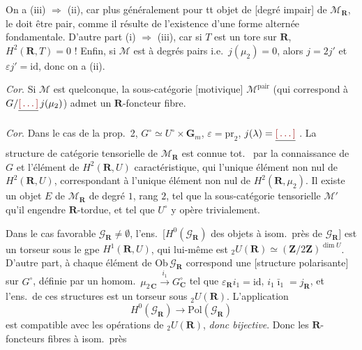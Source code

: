 \documentclass[11pt,a4paper]{article}
\begin{document}
On a (iii) $\Rightarrow$ (ii), car plus généralement pour tt
\struck{\ill{}} objet de [degré impair]  de
$\mathcal{M}_{\mathbf{R}}$, le   doit être
pair, comme il résulte de l'existence d'une forme alternée fondamentale.
D'autre part (i) $\Rightarrow$ (iii), car si $T$ est un tore
 sur $\mathbf{R}$, 
$H^{2}(\mathbf{R}, T) = 0$ ! Enfin, si  $\mathcal{M}$ est à
degrés pairs i.e.\ $j(\mu_{2}) = 0$, alors $j = 2j'$ et
$\varepsilon j' = \mathrm{id}$, donc on a (ii).

\emph{Cor}. Si $\mathcal{M}$ est quelconque, la sous-catégorie [motivique]
$\mathcal{M}^{\mathrm{pair}}$ \struck{\ill{}} (qui correspond à
$G/\struck{\ill{}}\,j(\mu_{2})$) \struck{\ill{}} admet un
$\mathbf{R}$-foncteur fibre.

\emph{Cor}. Dans le cas de la prop.\ 2,  
$G^{\circ} \simeq U^{\circ} \times \mathbf{G}_{m}$, $\varepsilon = \mathrm{pr}_{2}$,
$j(\lambda) = \struck{\ill{}}$ . La structure
 de catégorie tensorielle de
$\mathcal{M}_{\mathbf{R}}$ est connue tot.\ \ill{} par la connaissance de
$G$ et l'élément de $H^{2}(\mathbf{R}, U)$ caractéristique, qui
\struck{\ill{}} \ill{} l'unique élément non nul de $H^{2}(\mathbf{R}, U)$,
correspondant à l'unique élément non nul de $H^{2}(\mathbf{R}, \mu_{2})$.
Il existe un \struck{\ill{}} objet $E$ de $\mathcal{M}_{\mathbf{R}}$
\struck{\ill{}} de degré $1$, rang $2$, \struck{\ill{}} tel que la
sous-catégorie tensorielle \struck{\ill{}} $\mathcal{M}'$ qu'il engendre
\ill{} \ill{} $\mathbf{R}$-tordue, et \struck{\ill{} \ill{}} tel que
$U^{\circ}$ y opère trivialement.

Dans le cas favorable $\mathcal{G}_{\mathbf{R}} \neq \emptyset$,
 l'ens.\ [$H^{0}(\mathcal{G}_{\mathbf{R}})$
des objets à isom.\ près de $\mathcal{G}_{\mathbf{R}}$]
 est un  torseur sous le gpe $H^{1}(\mathbf{R}, U)$, qui
lui-même est \uncertain{isom.\ can.\ à}
${}_{2}U(\mathbf{R}) \simeq (\mathbf{Z}/2\mathbf{Z})^{\dim U}$.
D'autre part, à chaque élément de $\mathrm{Ob}\,\mathcal{G}_{\mathbf{R}}$
correspond une \struck{structure de \ill{}} [structure polarisante] sur
$G^{\circ}$, définie par un homom.\
$\mu_{2\,\mathbf{C}} \xrightarrow{\ i_{1}\ } G^{\circ}_{\mathbf{C}}$ tel
que $\varepsilon_{\mathbf{R}} i_{1} = \mathrm{id}$,
$i_{1}\bar{\imath}_{1} = j_{\mathbf{R}}$, et l'ens.\ de ces structures est
\uncertain{également} un torseur sous ${}_{2}U(\mathbf{R})$. L'application
\[
  H^{0}(\mathcal{G}_{\mathbf{R}}) \longrightarrow \mathrm{Pol}(\mathcal{G}_{\mathbf{R}})
\]
est compatible avec les opérations de ${}_{2}U(\mathbf{R})$, \emph{donc
bijective}. Donc les $\mathbf{R}$-foncteurs fibres à isom.\ près
\end{document}
